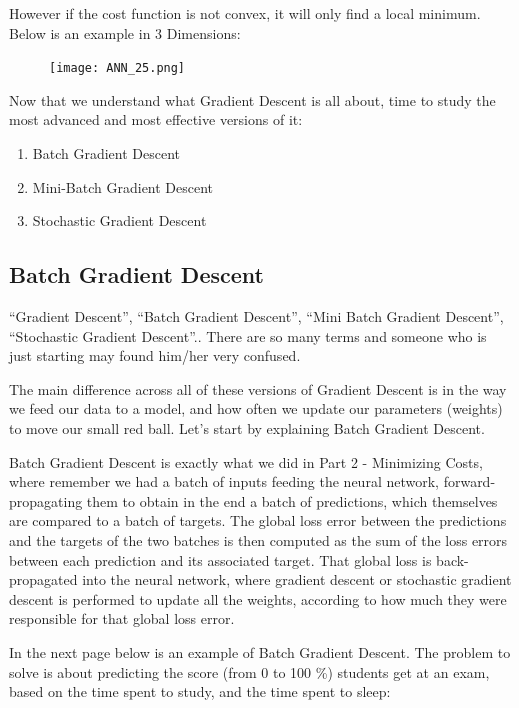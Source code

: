 \documentclass[]{book}
\begin{document}
However if the cost function is not convex, it will only find a local minimum. Below is an example in 3 Dimensions:

\begin{figure}[!htbp]
        \begin{center}
            \texttt{[image: ANN\_25.png]}
        \end{center}
\end{figure}

Now that we understand what Gradient Descent is all about, time to study the most advanced and most effective versions of it:

\begin{enumerate}
    \item Batch Gradient Descent
    \item Mini-Batch Gradient Descent
    \item Stochastic Gradient Descent
\end{enumerate}

\subsection{Batch Gradient Descent}

``Gradient Descent'', ``Batch Gradient Descent'', ``Mini Batch Gradient Descent'', ``Stochastic Gradient Descent''.. There are so many terms and someone who is just starting may found him/her very confused.

The main difference across all of these versions of Gradient Descent is in the way we feed our data to a model, and how often we update our parameters (weights) to move our small red ball. Let's start by explaining Batch Gradient Descent.

Batch Gradient Descent is exactly what we did in Part 2 - Minimizing Costs, where remember we had a batch of inputs feeding the neural network, forward-propagating them to obtain in the end a batch of predictions, which themselves are compared to a batch of targets. The global loss error between the predictions and the targets of the two batches is then computed as the sum of the loss errors between each prediction and its associated target. That global loss is back-propagated into the neural network, where gradient descent or stochastic gradient descent is performed to update all the weights, according to how much they were responsible for that global loss error.

In the next page below is an example of Batch Gradient Descent. The problem to solve is about predicting the score (from 0 to 100 \%) students get at an exam, based on the time spent to study, and the time spent to sleep:
\end{document}
